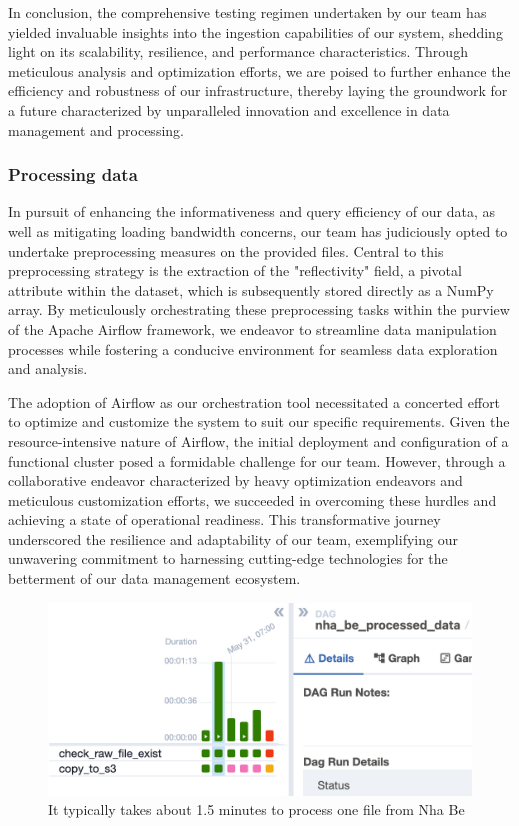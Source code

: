 In conclusion, the comprehensive testing regimen undertaken by our team has
yielded invaluable insights into the ingestion capabilities of our system,
shedding light on its scalability, resilience, and performance characteristics.
Through meticulous analysis and optimization efforts, we are poised to further
enhance the efficiency and robustness of our infrastructure, thereby laying the
groundwork for a future characterized by unparalleled innovation and excellence
in data management and processing.


\subsubsection{Processing data}

In pursuit of enhancing the informativeness and query efficiency of our data, as
well as mitigating loading bandwidth concerns, our team has judiciously opted to
undertake preprocessing measures on the provided files. Central to this
preprocessing strategy is the extraction of the "reflectivity" field, a pivotal
attribute within the dataset, which is subsequently stored directly as a NumPy
array. By meticulously orchestrating these preprocessing tasks within the
purview of the Apache Airflow framework, we endeavor to streamline data
manipulation processes while fostering a conducive environment for seamless data
exploration and analysis.

The adoption of Airflow as our orchestration tool necessitated a concerted
effort to optimize and customize the system to suit our specific requirements.
Given the resource-intensive nature of Airflow, the initial deployment and
configuration of a functional cluster posed a formidable challenge for our team.
However, through a collaborative endeavor characterized by heavy optimization
endeavors and meticulous customization efforts, we succeeded in overcoming these
hurdles and achieving a state of operational readiness. This transformative
journey underscored the resilience and adaptability of our team, exemplifying
our unwavering commitment to harnessing cutting-edge technologies for the
betterment of our data management ecosystem.

\begin{figure}[ht]
    \centering
    \includegraphics[width=0.8\linewidth]{Images/5-etl-data.png}
    \vspace{1cm}
    \caption{It typically takes about 1.5 minutes to process one file from Nha Be}
    \label{fig:etl-data}
\end{figure}

